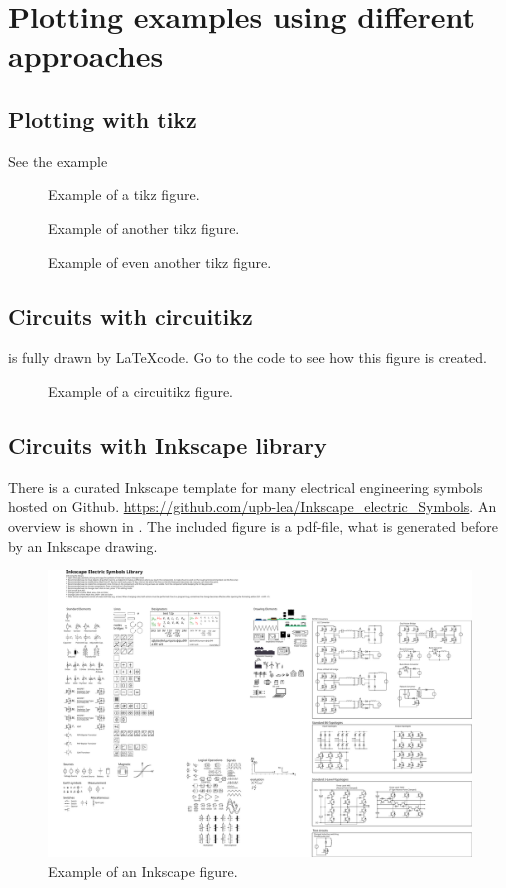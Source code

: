 \chapter{Plotting examples using different approaches} 
\label{cha:plotting}

\section{Plotting with tikz}

See the example 
\begin{figure}[ht]
    \centering
    
    \caption{Example of a tikz figure.}
    \label{fig:tikz_example_01}
\end{figure}
\begin{figure}[ht]
    \centering
    
    \caption{Example of another tikz figure.}
    \label{fig:tikz_example_02}
\end{figure}
\begin{figure}[ht]
    \centering
    
    \caption{Example of even another tikz figure.}
    \label{fig:tikz_example_03}
\end{figure}



\section{Circuits with circuitikz}
 is fully drawn by \LaTeX code. Go to the code to see how this figure is created.
\begin{figure}[ht]
    \centering
    
    \caption{Example of a circuitikz figure.}
    \label{fig:circuitikz_example}
\end{figure}


\section{Circuits with Inkscape library}
There is a curated Inkscape template for many electrical engineering symbols hosted on Github. \href{https://github.com/upb-lea/Inkscape_electric_Symbols}{https://github.com/upb-lea/Inkscape\_electric\_Symbols}. An overview is shown in . The included figure is a pdf-file, what is generated before by an Inkscape drawing.

\begin{figure}[htb]
	\centering
    \includegraphics[]{fig/inkscape/Inkscape_Symbols_All.pdf}
	\caption{Example of an Inkscape figure.}
	\label{fig:inkscape_example}
\end{figure}

